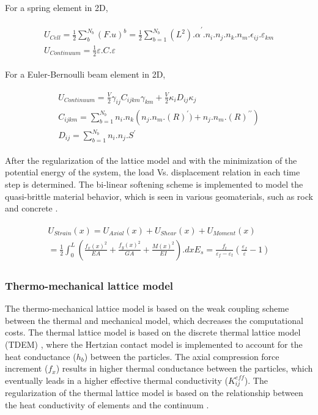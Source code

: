 For a spring element in 2D,

\begin{align}
\label{eq:LEM_Mechanical_2}
\begin{split}
U_{Cell}=\frac{1}{2}\sum_{b}^{N_b}\left(F.u\right)^b=\frac{1}{2}\sum_{b=1}^{N_b}{{(L^2).\alpha}^\prime.n_i.n_j.n_k.n_m.\epsilon_{ij}.\varepsilon_{km}}\\
U_{Continuum}=\frac{1}{2}\varepsilon.C.\varepsilon
\end{split}
\end{align}

For a Euler-Bernoulli beam element in 2D,

\begin{align}
\label{eq:LEM_Mechanical_3}
\begin{split}
U_{Continuum}=\frac{V}{2}\gamma_{ij}C_{ijkm}\gamma_{km}+\frac{V}{2}\kappa_{i}D_{ij}\kappa_j
\\
C_{ijkm}=\sum_{b=1}^{N_b} {n_i.n_k \left( n_j.n_m.(R)^\prime)+n_j.n_m.(R)^{\prime\prime} \right)}
\\
D_{ij}=\sum_{b=1}^{N_b}{n_i.n_j}.S^\prime
\end{split}
\end{align}

After the regularization of the lattice model and with the minimization of the potential energy of the system, the load Vs. displacement relation in each time step is determined. The bi-linear softening scheme is implemented to model the quasi-brittle material behavior, which is seen in various geomaterials, such as rock and concrete \cite{Inceetal2003}. 

\begin{align}
\label{eq:LEM_Mechanical_4}
\begin{split}
 U_{Strain}(x)=U_{Axial}(x)+U_{Shear}(x)+U_{Moment}(x)
 \\
 =
 \frac{1}{2}\int_{0}^{L}{\left(\frac{f_x{(x)}^2}{EA}+\frac{f_y{(x)}^2}{GA}+\frac{M{(x)}^2}{EI}\right).dx} 
 E_s=\frac{f_t}{\varepsilon_f-\varepsilon_t}\left(\frac{\varepsilon_f}{\varepsilon}-1\right)
\end{split}
\end{align}


\subsubsection*{Thermo-mechanical lattice model}

The thermo-mechanical lattice model is based on the weak coupling scheme between the thermal and mechanical model, which decreases the computational costs. The thermal lattice model is based on the discrete thermal lattice model (TDEM) \cite{Zhangetal2011, Fengetal2008}, where the Hertzian contact model is implemented to account for the heat conductance ($h_b$) between the particles. The axial compression force increment ($f_x$) results in higher thermal conductance between the particles, which eventually leads in a higher effective thermal conductivity ($K_{ij}^{eff}$). The regularization of the thermal lattice model is based on the relationship between the heat conductivity of elements and the continuum \cite{Rizvietal2018b}. 

